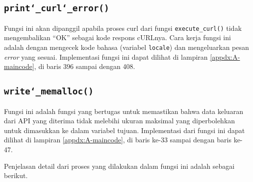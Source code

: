 \subsection{\texttt{print\char`_curl\char`_error()}}
\label{sec:testing-implementation-curl-error}

Fungsi ini akan dipanggil apabila proses curl dari fungsi \verb|execute_curl()| tidak mengembalikan ``OK'' sebagai kode respons cURLnya. Cara kerja fungsi ini adalah dengan mengecek kode bahasa (variabel \verb|locale|) dan mengeluarkan pesan \textit{error} yang sesuai. Implementasi fungsi ini dapat dilihat di lampiran \ref{appdx:A-maincode}, di baris 396 sampai dengan 408.
	
\subsection{\texttt{write\char`_memalloc()}}
\label{sec:testing-implementation-write-memalloc}

Fungsi ini adalah fungsi yang bertugas untuk memastikan bahwa data keluaran dari API yang diterima tidak melebihi ukuran maksimal yang diperbolehkan untuk dimasukkan ke dalam variabel tujuan. Implementasi dari fungsi ini dapat dilihat di lampiran \ref{appdx:A-maincode}, di baris ke-33 sampai dengan baris ke-47.

Penjelasan detail dari proses yang dilakukan dalam fungsi ini adalah sebagai berikut.

